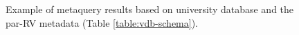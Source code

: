 \begin{figure}[htb]
\begin{center}
\caption{Example of metaquery results based on university database and the par-RV metadata (Table \ref{table:vdb-schema}).
~\label{fig:meta-query}}
\end{center}
\end{figure}
%
%

